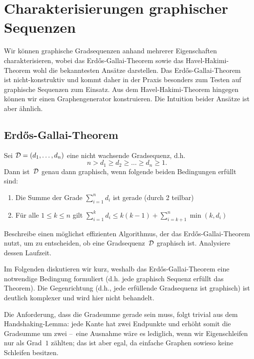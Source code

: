 \section{Charakterisierungen graphischer Sequenzen}
Wir können graphische Gradsequenzen anhand mehrerer Eigenschaften charakterisieren, wobei das Erd\H{o}s-Gallai-Theorem sowie das Havel-Hakimi-Theorem wohl die bekanntesten Ansätze darstellen.
Das Erd\H{o}s-Gallai-Theorem ist nicht-konstruktiv und kommt daher in der Praxis besonders zum Testen auf graphische Sequenzen zum Einsatz.
Aus dem Havel-Hakimi-Theorem hingegen können wir einen Graphengenerator konstruieren.
Die Intuition beider Ansätze ist aber ähnlich.

\subsection{Erd\H{o}s-Gallai-Theorem}
\begin{theorem}
    Sei $\mathcal{D} = (d_1, \ldots, d_n)$ eine nicht wachsende Gradsequenz, d.h.
    \begin{equation}
        n > d_1 \ge d_2 \ge \ldots \ge d_n \ge 1.
    \end{equation}
    Dann ist~$\mathcal{D}$ genau dann graphisch, wenn folgende beiden Bedingungen erfüllt sind:
    \begin{enumerate}
        \item Die Summe der Grade $\sum_{i=1}^n d_i$ ist gerade (durch 2 teilbar)
        \item Für alle $1 \le k \le n$ gilt $\sum_{i=1}^k d_i \le k(k-1) + \sum_{i=k+1}^n \min(k, d_i)$\qedhere
    \end{enumerate}
\end{theorem}

\begin{exercise}
    Beschreibe einen möglichst effizienten Algorithmus, der das Erd\H{o}s-Gallai-Theorem nutzt, um zu entscheiden, ob eine Gradsequenz~$\mathcal{D}$ graphisch ist.
    Analysiere dessen Laufzeit.
\end{exercise}

Im Folgenden diskutieren wir kurz, weshalb das Erd\H{o}s-Gallai-Theorem eine notwendige Bedingung formuliert (d.h. jede graphisch Sequenz erfüllt das Theorem).
Die Gegenrichtung (d.h., jede erfüllende Gradsequenz ist graphisch) ist deutlich komplexer und wird hier nicht behandelt.

Die Anforderung, dass die Gradsumme gerade sein muss, folgt trivial aus dem Handshaking-Lemma:
jede Kante hat zwei Endpunkte und erhöht somit die Gradsumme um zwei
--~eine Ausnahme wäre es lediglich, wenn wir Eigenschleifen nur als Grad~$1$ zählten; das ist aber egal, da einfache Graphen sowieso keine Schleifen besitzen.

